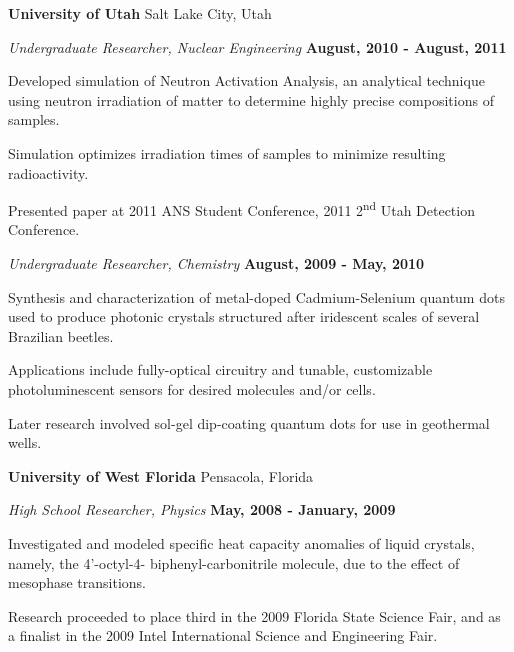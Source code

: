 \documentclass[margin,line]{res}
\newenvironment{list1}{
  \begin{list}{\ding{113}}{%
      \setlength{\itemsep}{0in}
      \setlength{\parsep}{0in} \setlength{\parskip}{0in}
      \setlength{\topsep}{0in} \setlength{\partopsep}{0in} 
      \setlength{\leftmargin}{0.17in}}}{\end{list}}
\begin{document}
\begin{resume}
{\bf University of Utah} \hfill{ Salt Lake City, Utah}

\vspace*{-.05in}
{\em Undergraduate Researcher, Nuclear Engineering} \hfill {\bf August, 2010 - August, 2011}

\begin{list1}
\item[] Developed simulation of Neutron Activation Analysis, an analytical technique using neutron
irradiation of matter to determine highly precise compositions of samples.
\item[] Simulation optimizes irradiation times of samples to minimize resulting radioactivity.
\item[] Presented paper at 2011 ANS Student Conference, 2011 2\textsuperscript{nd} Utah
Detection Conference.
\end{list1}


{\em Undergraduate Researcher, Chemistry} \hfill {\bf August, 2009 - May, 2010}

\begin{list1}
\item[] Synthesis and characterization of metal-doped Cadmium-Selenium quantum dots used to produce
photonic crystals structured after iridescent scales of several Brazilian beetles.
\item[] Applications include fully-optical circuitry and tunable, customizable photoluminescent sensors for
desired molecules and/or cells.
\item[] Later research involved sol-gel dip-coating quantum dots for use in geothermal wells.
\end{list1}

{\bf University of West Florida} \hfill{ Pensacola, Florida}

\vspace*{-.05in}
{\em  High School Researcher, Physics} \hfill {\bf May, 2008 - January, 2009}

\begin{list1}
\item[] Investigated and modeled specific heat capacity anomalies of liquid crystals, namely, the 4'-octyl-4-
biphenyl-carbonitrile molecule, due to the effect of mesophase transitions.
\item[] Research proceeded to place third in the 2009 Florida State Science Fair, and as a finalist in the
2009 Intel International Science and Engineering Fair.
\end{list1}


\pagebreak


\end{resume}
\end{document}
